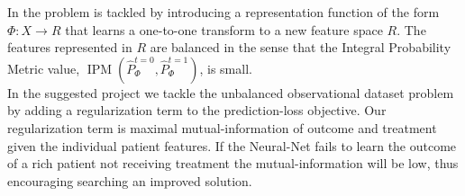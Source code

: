 \documentclass[oneside,12pt]{article}
\begin{document}
In \cite{pmlr-v70-shalit17a} the problem is tackled by introducing a representation function of the form $\Phi: X \rightarrow R$ that learns a one-to-one transform to a new feature space $R$. The features represented in $R$ are balanced in the sense that the Integral Probability Metric value, $\operatorname{IPM}(\hat{P}^{t=0}_\Phi, \hat{P}^{t=1}_\Phi)$, is small.\\

In the suggested project we tackle the unbalanced observational dataset problem by adding a regularization term to the prediction-loss objective. Our regularization term is maximal mutual-information of outcome and treatment given the individual patient features. If the Neural-Net fails to learn the outcome of a rich patient not receiving treatment the mutual-information will be low, thus encouraging searching an improved solution.  
%
\end{document}

